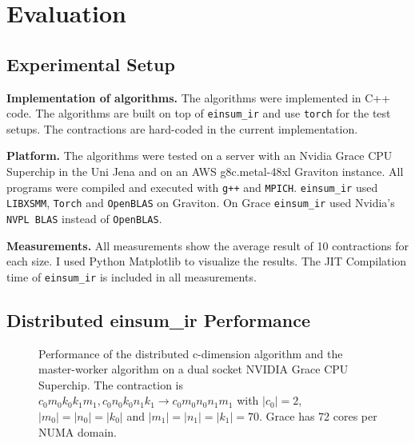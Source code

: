 \section{Evaluation}

\subsection{Experimental Setup}

\textbf{Implementation of algorithms.}
The algorithms were implemented in C++ code.
The algorithms are built on top of \texttt{einsum\_ir} and use \texttt{torch} for the test setups.
The contractions are hard-coded in the current implementation.

\textbf{Platform.}
The algorithms were tested on a server with an Nvidia Grace CPU Superchip in the Uni Jena and on an AWS g8c.metal-48xl Graviton instance.
All programs were compiled and executed with \texttt{g++} and \texttt{MPICH}.
\texttt{einsum\_ir} used \texttt{LIBXSMM}, \texttt{Torch} and  \texttt{OpenBLAS} on Graviton.
On Grace \texttt{einsum\_ir} used Nvidia's \texttt{NVPL BLAS} instead of \texttt{OpenBLAS}.

\textbf{Measurements.}
All measurements show the average result of 10 contractions for each size.
I used Python Matplotlib\cite{matplotlib} to visualize the results.
The JIT Compilation time of \texttt{einsum\_ir} is included in all measurements.


\subsection{Distributed einsum\_ir Performance}

\begin{figure}[ht]
  \caption{
    Performance of the distributed c-dimension algorithm and the master-worker algorithm on a dual socket NVIDIA Grace CPU Superchip.
    The contraction is $c_0m_0k_0k_1m_1, c_0n_0k_0n_1k_1 \rightarrow c_0m_0n_0n_1m_1$ with $|c_0|=2$, $|m_0|=|n_0|=|k_0|$ and $|m_1|=|n_1|=|k_1|=70$.
    Grace has 72 cores per NUMA domain.
    }
  \label{fig:master_worker_perf}
\end{figure}


